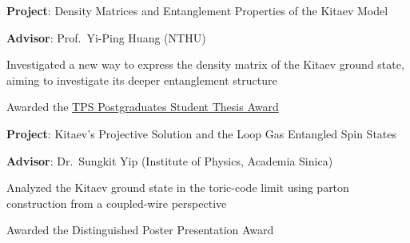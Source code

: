 \documentclass[12font]{article}
\begin{document}







    \begin{sublist}
        \item \textbf{Project}: Density Matrices and Entanglement Properties of the Kitaev Model
        \item \textbf{Advisor}: Prof.~Yi-Ping Huang (NTHU) 
        \item Investigated a new way to express the density matrix of the Kitaev ground state, aiming to investigate its deeper entanglement structure
        \item Awarded the \href{https://ps-taiwan.org/tw/modules/news/article.php?storyid=570&fbclid=IwY2xjawV0nYFleHRuA2FlbQIxMABwZG9mAWJyaWQRMVA2WEl3WjhPR1h3Tm9PT3lzcnRjBmFwcF9pZBAyMjIwMzkxNzg4MjAwODkyAAEfIpyin8-1BACYfO6I2yC23zGASGeg81BBx2rW948dtmVUF0ROJm0ZTrZf63E_aem_YbPul9ku9ZCnOlRmnJXYng}
                                {TPS Postgraduates Student Thesis Award}
    \end{sublist}


    \begin{sublist}
        \item \textbf{Project}: Kitaev's Projective Solution and the Loop Gas Entangled Spin States
        \item \textbf{Advisor}: Dr.~Sungkit Yip (Institute of Physics, Academia Sinica)
        \item Analyzed the Kitaev ground state in the toric-code limit using parton construction from a coupled-wire perspective
        \item Awarded the Distinguished Poster Presentation Award
    \end{sublist}
\end{document}
